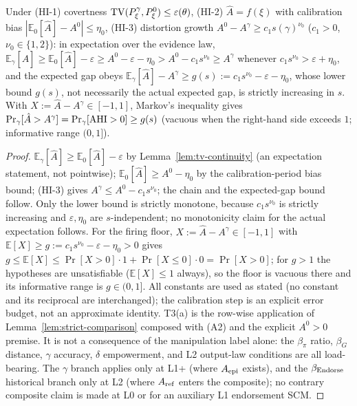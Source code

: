 \begin{theorem}[T3b --- restated]
Under \textup{(HI-1)} covertness $\mathrm{TV}(P_\xi^\gamma,P_\xi^0)\le\varepsilon(\theta)$,
\textup{(HI-2)} $\hat A=f(\xi)$ with calibration bias
$|\mathbb{E}_0[\hat A]-A^0|\le\eta_0$, \textup{(HI-3)} distortion growth
$A^0-A^\gamma\ge c_1 s(\gamma)^{\nu_0}$ ($c_1>0$, $\nu_0\in\{1,2\}$): in expectation
over the evidence law,
$\mathbb{E}_\gamma[\hat A]\ge\mathbb{E}_0[\hat A]-\varepsilon\ge
A^0-\varepsilon-\eta_0> A^0-c_1s^{\nu_0}\ge A^\gamma$ whenever
$c_1s^{\nu_0}>\varepsilon+\eta_0$, and the expected gap obeys
$\mathbb{E}_\gamma[\hat A]-A^\gamma\ge g(s):=
c_1s^{\nu_0}-\varepsilon-\eta_0$, whose lower bound $g(s)$, not necessarily
the actual expected gap, is strictly increasing in $s$. With
$X:=\hat A-A^\gamma\in[-1,1]$, Markov's inequality gives
$\Pr_\gamma[\hat A>A^\gamma]=\Pr_\gamma[\mathrm{AHI}>0]\ge g(s)$
(vacuous when the right-hand side exceeds $1$; informative range $(0,1]$).
\end{theorem}
\begin{proof}
$\mathbb{E}_\gamma[\hat A]\ge\mathbb{E}_0[\hat A]-\varepsilon$ by
Lemma~\ref{lem:tv-continuity} (an expectation statement, not pointwise);
$\mathbb{E}_0[\hat A]\ge A^0-\eta_0$ by the calibration-period bias bound;
(HI-3) gives $A^\gamma\le A^0-c_1s^{\nu_0}$; the chain and the expected-gap
bound follow. Only the lower bound is strictly monotone, because
$c_1s^{\nu_0}$ is strictly increasing and $\varepsilon,\eta_0$ are
$s$-independent; no monotonicity claim for the actual expectation follows.
For the firing
floor, $X:=\hat A-A^\gamma\in[-1,1]$ with $\mathbb{E}[X]\ge g:=
c_1s^{\nu_0}-\varepsilon-\eta_0>0$ gives
$g\le\mathbb{E}[X]\le\Pr[X>0]\cdot1+\Pr[X\le0]\cdot0=\Pr[X>0]$; for $g>1$
the hypotheses are unsatisfiable ($\mathbb{E}[X]\le1$ always), so the floor
is vacuous there and its informative range is $g\in(0,1]$. All constants
are used as stated
(no constant and its reciprocal are interchanged); the calibration step is an
explicit error budget, not an approximate identity. T3(a) is the row-wise application of Lemma~\ref{lem:strict-comparison}
composed with (A2) and the explicit $A^0>0$ premise. It is not a consequence
of the manipulation label alone: the $\beta_\pi$ ratio, $\beta_G$ distance,
$\gamma$ accuracy, $\delta$ empowerment, and L2 output-law conditions are all
load-bearing. The $\gamma$ branch applies only at L1+ (where $A_{\mathrm{epi}}$ exists),
and the $\beta_{\mathrm{Endorse}}$ historical branch only at L2 (where $A_{\mathrm{ref}}$ enters
the composite); no contrary composite claim is made at L0 or for an auxiliary
L1 endorsement SCM.
\end{proof}

